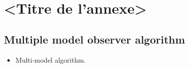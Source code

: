 \chapter{<Titre de l'annexe>}     %
\label{chap-}                   %

\section{Multiple model observer algorithm}

\begin{itemize}
	\item Multi-model algorithm.
\end{itemize}
